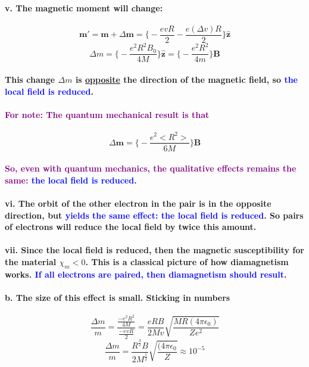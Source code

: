 \documentclass{article}
\begin{document}
\paragraph{\indent\indent v. The magnetic moment will change:}
\begin{equation*}
    \boldsymbol{m}'=\boldsymbol{m}+\Delta\boldsymbol{m}=\bigg\{ -\frac{evR}{2}-\frac{e(\Delta v)R}{2}\bigg\}\hat{\boldsymbol{z}}
\end{equation*}
\begin{equation*}
    \Delta m=\bigg\{ -\frac{e^2R^2B_0}{4M}\bigg\}\hat{\boldsymbol{z}}=\bigg\{ -\frac{e^2R^2}{4m}\bigg\} \boldsymbol{B}
\end{equation*}
\paragraph{\indent This change $\Delta m$ is \underline{opposite} the direction of the magnetic field, so \textcolor{blue}{the local field is reduced}.}
\paragraph{\textcolor{purple}{For note: The quantum mechanical result is that}}
\begin{equation*}
    \Delta\boldsymbol{m}=\bigg\{-\frac{e^2<R^2>}{6M}\bigg\}\boldsymbol{B}
\end{equation*}
\paragraph{\textcolor{purple}{So, even with quantum mechanics, the qualitative effects remains the same: \textcolor{blue}{the local field is reduced}}.}
\paragraph{\indent\indent vi. The orbit of the other electron in the pair is in the opposite direction, but \textcolor{blue}{yields the same effect: the local field is reduced}. So pairs of electrons will reduce the local field by twice this amount.}
\paragraph{\indent\indent vii. Since the local field is reduced, then the magnetic susceptibility for the material $\chi_m<0$. This is a classical picture of how diamagnetism works. \textcolor{blue}{If all electrons are paired, then diamagnetism should result}.}
\paragraph{\indent b. The size of this effect is small. Sticking in numbers}
\begin{equation*}
    \frac{\Delta m}{m}=\frac{\frac{-e^2R^2}{4M}}{\frac{-evR}{2}}=\frac{eRB}{2Mv}\sqrt{\frac{MR(4\pi\epsilon_0)}{Ze^2}}
\end{equation*}
\begin{equation*}
    \frac{\Delta m}{m}=\frac{R^{\frac{3}{2}}B}{2M^{\frac{1}{2}}}\sqrt{\frac{(4\pi\epsilon_0}{Z}}\approx 10^{-5}
\end{equation*}
\end{document}
